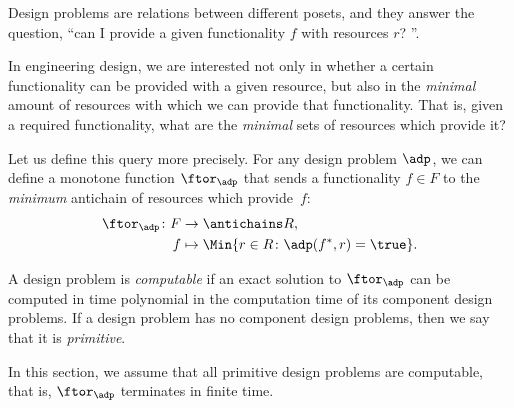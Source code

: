 
\label{sec:computation}

Design problems are relations between different posets, and they answer the question, ``can I provide a given functionality $f$ with resources $r$?
''.

In engineering design, we are interested not only in whether a certain functionality can be provided with a given resource, but also in the \emph{minimal} amount of resources with which we can provide that functionality.
That is, given a required functionality, what are the \emph{minimal} sets of resources which provide it?

Let us define this query more precisely.
For any design problem $\adp$, we can define a monotone function $\ftor_\adp$ that sends a functionality $f \in F$ to the \emph{minimum} antichain of resources which provide~$f$:
\begin{equation}
    \begin{aligned}
        \ftor_\adp \colon F & \to \antichains R,                                      \\
        f                   & \mapsto \Min \{ r \in R \colon \adp(f^*, r) = \true \}.
    \end{aligned}
\end{equation}

\begin{definition}
    A design problem is \emph{computable} if an exact solution to $\ftor_\adp$ can be computed in time polynomial in the computation time of its component design problems.
    If a design problem has no component design problems, then we say that it is \emph{primitive}.
\end{definition}

In this section, we assume that all primitive design problems are computable, that is, $\ftor_\adp$ terminates in finite time.


